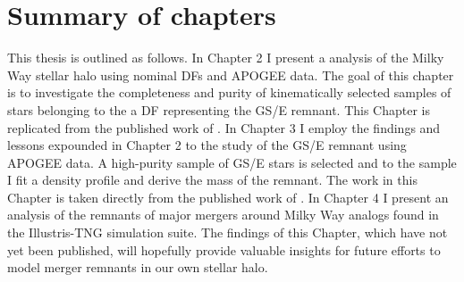 \section{Summary of chapters}

This thesis is outlined as follows. In Chapter 2 I present a analysis of the Milky Way stellar halo using nominal DFs and APOGEE data. The goal of this chapter is to investigate the completeness and purity of kinematically selected samples of stars belonging to the a DF representing the GS/E remnant. This Chapter is replicated from the published work of \textcite{lane20}. In Chapter 3 I employ the findings and lessons expounded in Chapter 2 to the study of the GS/E remnant using APOGEE data. A high-purity sample of GS/E stars is selected and to the sample I fit a density profile and derive the mass of the remnant. The work in this Chapter is taken directly from the published work of \textcite{lane22}. In Chapter 4 I present an analysis of the remnants of major mergers around Milky Way analogs found in the Illustris-TNG simulation suite. The findings of this Chapter, which have not yet been published, will hopefully provide valuable insights for future efforts to model merger remnants in our own stellar halo.

